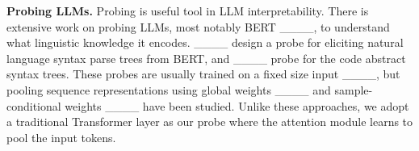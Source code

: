 \textbf{Probing LLMs.}
Probing is useful tool in LLM interpretability.
There is extensive work on probing LLMs, most notably BERT ____, to understand what linguistic knowledge it encodes. ____ design a probe for eliciting natural language syntax parse trees from BERT, and ____ probe for the code abstract syntax trees.
These probes are usually trained on a fixed size input ____, but pooling sequence representations using global weights ____ and sample-conditional weights ____ have been studied. Unlike these approaches, we adopt a traditional Transformer layer as our probe where the attention module learns to pool the input tokens.


